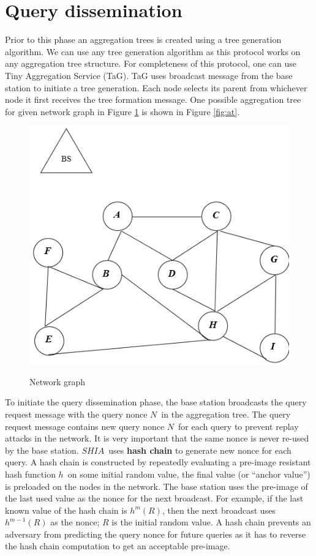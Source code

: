 	\section{Query dissemination}
		Prior to this phase an aggregation trees is created using a tree generation algorithm.
		We can use any tree generation algorithm as this protocol works on any aggregation tree structure.
		For completeness of this protocol, one can use Tiny Aggregation Service (TaG)\cite{madden2002tag}.
		TaG uses broadcast message from the base station to initiate a tree generation.
		Each node selects its parent from whichever node it first receives the tree formation message.
		One possible aggregation tree for given network graph in Figure \ref{fig:ng} is shown in Figure \ref{fig:at}. 
		\begin{figure}[hp]
			\centering
			\includegraphics[scale = 0.7]{images/network-graph.png}\\
			\caption{Network graph}
			\label{fig:ng}
		\end{figure}
		
		To initiate the query dissemination phase, the base station broadcasts the query request message with the query nonce $N$\ in the aggregation tree. 
		The query request message contains new query nonce $N$\ for each query to prevent replay attacks in the network.
		It is very important that the same nonce is never re-used by the base station.
		$SHIA$\ uses \textbf{hash chain} to generate new nonce for each query. 
		A hash chain is constructed by repeatedly evaluating a pre-image resistant hash function $h$\ on some initial random value, the final value (or ``anchor value'') is preloaded on the nodes in the network.
		The base station uses the pre-image of the last used  value as the nonce for the next broadcast.
		For example, if the last known value of the hash chain is $h^m(R)$, then the next broadcast uses $h^{m-1}(R)$ as the nonce; $R$ is the initial random value.  
		A hash chain prevents an adversary from predicting the query nonce for future queries as it has to reverse the hash chain computation to get an acceptable pre-image.

